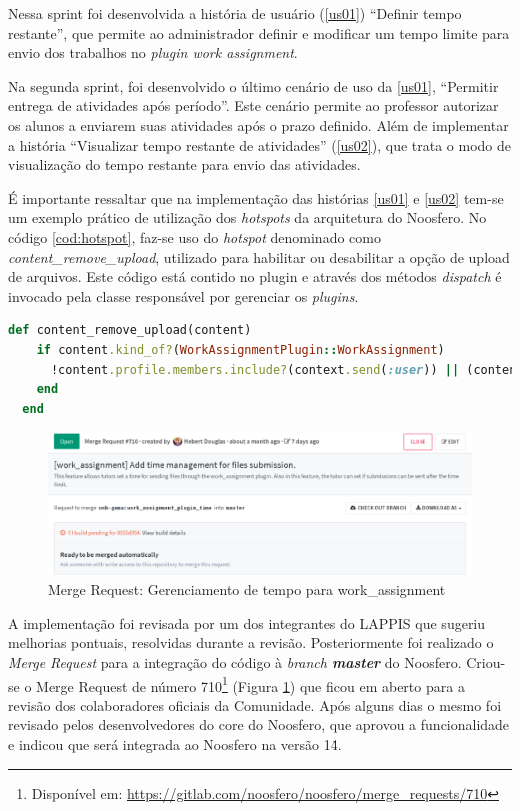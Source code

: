 Nessa sprint foi desenvolvida a história de usuário (\ref{us01}) ``Definir tempo restante'', que permite ao administrador definir e modificar um tempo limite para envio dos trabalhos no \textit{plugin work assignment}.

Na segunda sprint, foi desenvolvido o último cenário de uso da \ref{us01}, ``Permitir entrega de atividades após período''. Este cenário permite ao professor autorizar os alunos a enviarem suas atividades após o prazo definido. Além de implementar a história ``Visualizar tempo restante de atividades'' (\ref{us02}), que trata o modo de visualização do tempo restante para envio das atividades.

É importante ressaltar que na implementação das histórias \ref{us01} e \ref{us02} tem-se um exemplo prático de utilização dos \textit{hotspots} da arquitetura do Noosfero. No código \ref{cod:hotspot}, faz-se uso do \textit{hotspot} denominado como \textit{content\_remove\_upload}, utilizado para habilitar ou desabilitar a opção de upload de arquivos. Este código está contido no plugin e através dos métodos \textit{dispatch} é invocado pela classe responsável por gerenciar os \textit{plugins}.

\begin{lstlisting}[language=Ruby, caption={Código de implementação do \textit{hotspot}}, label=cod:hotspot]
  def content_remove_upload(content)
    if content.kind_of?(WorkAssignmentPlugin::WorkAssignment)
      !content.profile.members.include?(context.send(:user)) || (content.expired? && !content.ignore_time)
    end
  end
\end{lstlisting}

\begin{figure}[h]
    \centering
    \includegraphics[keepaspectratio=true,scale=0.42]
      {figuras/merge-request710.eps}
    \caption{Merge Request: Gerenciamento de tempo para work\_assignment}
    \label{fig:merge-710}
\end{figure}

A implementação foi revisada por um dos integrantes do LAPPIS que sugeriu melhorias pontuais, resolvidas durante a revisão. Posteriormente foi realizado o \textit{Merge Request} para a integração do código à \textit{branch \textbf{master}} do Noosfero. Criou-se o Merge Request de número 710\footnote{Disponível em: \url{https://gitlab.com/noosfero/noosfero/merge_requests/710}} (Figura \ref{fig:merge-710}) que ficou em aberto para a revisão dos colaboradores oficiais da Comunidade. Após alguns dias o mesmo foi revisado pelos desenvolvedores do core do Noosfero, que aprovou a funcionalidade e indicou que será integrada ao Noosfero na versão 1\.4.

